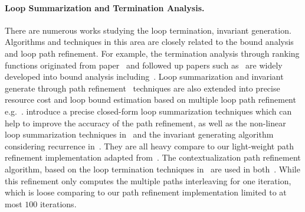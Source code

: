 \paragraph{Loop Summarization and Termination Analysis.}
There are numerous works studying the loop termination, 
invariant generation. Algorithms and techniques in this area are closely related to the bound analysis and loop path refinement.
For example, the termination analysis through ranking functions originated from paper~\cite{BradleyMS05} and followed up papers such as~\cite{FalkeKS11, FalkeKS12, CookSZ13, Zuleger18} are widely developed into bound analysis including~\cite{AliasDFG10, SinnZV14, BrockschmidtEFFG16, BrockschmidtEFFG14}.
Loop summarization and invariant generate through path refinement~\cite{ManoliosV06, BalakrishnanSIG09, SharmaDDA11, Flores-MontoyaH14, HumenbergerJK18, CyphertBKR19} techniques are also extended into precise resource cost and loop bound estimation based on multiple loop path refinement e.g.~\cite{GulwaniJK09, ZulegerGSV11}. 
\cite{KincaidBCR19} introduce a precise closed-form loop summarization techniques which can help to improve the accuracy of the path refinement, as well as the non-linear loop summarization techniques in~\cite{KincaidCBR18} and the invariant generating algorithm considering recurrence in~\cite{BreckCKR20}. They are all heavy compare to our light-weight path refinement implementation adapted from~\cite{GulwaniJK09}.
The contextualization path refinement algorithm, based on the loop termination techniques in~\cite{ManoliosV06} are used in both~\cite{ZulegerGSV11, SinnZV14}. While this refinement only computes the multiple paths interleaving for one iteration, which is loose comparing to our path refinement implementation limited to at most $100$ iterations.
